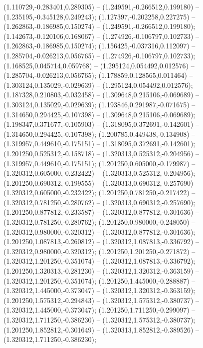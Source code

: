 (1.110729,-0.283401,0.289305) -- (1.249591,-0.266512,0.199180) -- (1.235195,-0.345128,0.249243);
 (1.127397,-0.202258,0.227275) -- (1.262863,-0.186985,0.150274) -- (1.249591,-0.266512,0.199180);
 (1.142673,-0.120106,0.168067) -- (1.274926,-0.106797,0.102733) -- (1.262863,-0.186985,0.150274);
 (1.156425,-0.037316,0.112097) -- (1.285704,-0.026213,0.056765) -- (1.274926,-0.106797,0.102733);
 (1.168525,0.045714,0.059768) -- (1.295124,0.054492,0.012576) -- (1.285704,-0.026213,0.056765);
 (1.178859,0.128565,0.011464) -- (1.303124,0.135029,-0.029639) -- (1.295124,0.054492,0.012576);
 (1.187328,0.210803,-0.032458) -- (1.309648,0.215106,-0.069689) -- (1.303124,0.135029,-0.029639);
 (1.193846,0.291987,-0.071675) -- (1.314650,0.294425,-0.107398) -- (1.309648,0.215106,-0.069689);
 (1.198347,0.371677,-0.105903) -- (1.318095,0.372691,-0.142601) -- (1.314650,0.294425,-0.107398);
 (1.200785,0.449438,-0.134908) -- (1.319957,0.449610,-0.175151) -- (1.318095,0.372691,-0.142601);
 (1.201250,0.525312,-0.158718) -- (1.320313,0.525312,-0.204956) -- (1.319957,0.449610,-0.175151);
 (1.201250,0.605000,-0.179987) -- (1.320312,0.605000,-0.232422) -- (1.320313,0.525312,-0.204956);
 (1.201250,0.690312,-0.199555) -- (1.320313,0.690312,-0.257690) -- (1.320312,0.605000,-0.232422);
 (1.201250,0.781250,-0.217422) -- (1.320312,0.781250,-0.280762) -- (1.320313,0.690312,-0.257690);
 (1.201250,0.877812,-0.233587) -- (1.320312,0.877812,-0.301636) -- (1.320312,0.781250,-0.280762);
 (1.201250,0.980000,-0.248050) -- (1.320312,0.980000,-0.320312) -- (1.320312,0.877812,-0.301636);
 (1.201250,1.087813,-0.260812) -- (1.320312,1.087813,-0.336792) -- (1.320312,0.980000,-0.320312);
 (1.201250,1.201250,-0.271872) -- (1.320312,1.201250,-0.351074) -- (1.320312,1.087813,-0.336792);
 (1.201250,1.320313,-0.281230) -- (1.320312,1.320312,-0.363159) -- (1.320312,1.201250,-0.351074);
 (1.201250,1.445000,-0.288887) -- (1.320312,1.445000,-0.373047) -- (1.320312,1.320312,-0.363159);
 (1.201250,1.575312,-0.294843) -- (1.320312,1.575312,-0.380737) -- (1.320312,1.445000,-0.373047);
 (1.201250,1.711250,-0.299097) -- (1.320312,1.711250,-0.386230) -- (1.320312,1.575312,-0.380737);
 (1.201250,1.852812,-0.301649) -- (1.320313,1.852812,-0.389526) -- (1.320312,1.711250,-0.386230);
